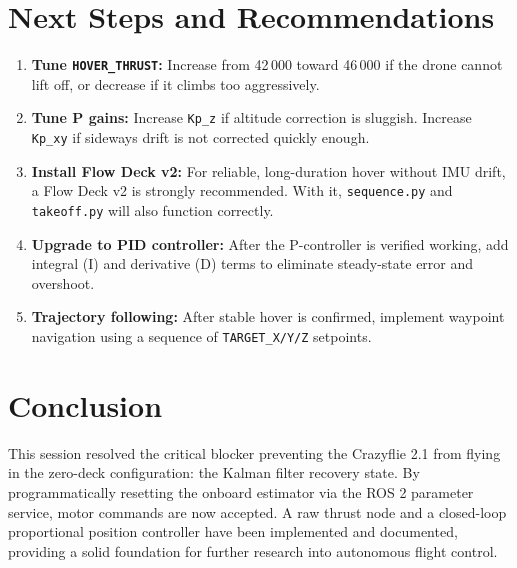 \documentclass[11pt,a4paper]{article}
\begin{document}
\section{Next Steps and Recommendations}

\begin{enumerate}
    \item \textbf{Tune \texttt{HOVER\_THRUST}:} Increase from 42\,000 toward 46\,000 if the drone cannot lift off, or decrease if it climbs too aggressively.
    \item \textbf{Tune P gains:} Increase \texttt{Kp\_z} if altitude correction is sluggish. Increase \texttt{Kp\_xy} if sideways drift is not corrected quickly enough.
    \item \textbf{Install Flow Deck v2:} For reliable, long-duration hover without IMU drift, a Flow Deck v2 is strongly recommended. With it, \texttt{sequence.py} and \texttt{takeoff.py} will also function correctly.
    \item \textbf{Upgrade to PID controller:} After the P-controller is verified working, add integral (I) and derivative (D) terms to eliminate steady-state error and overshoot.
    \item \textbf{Trajectory following:} After stable hover is confirmed, implement waypoint navigation using a sequence of \texttt{TARGET\_X/Y/Z} setpoints.
\end{enumerate}

\section{Conclusion}

This session resolved the critical blocker preventing the Crazyflie 2.1 from flying in the zero-deck configuration: the Kalman filter recovery state. By programmatically resetting the onboard estimator via the ROS 2 parameter service, motor commands are now accepted. A raw thrust node and a closed-loop proportional position controller have been implemented and documented, providing a solid foundation for further research into autonomous flight control.
\end{document}
